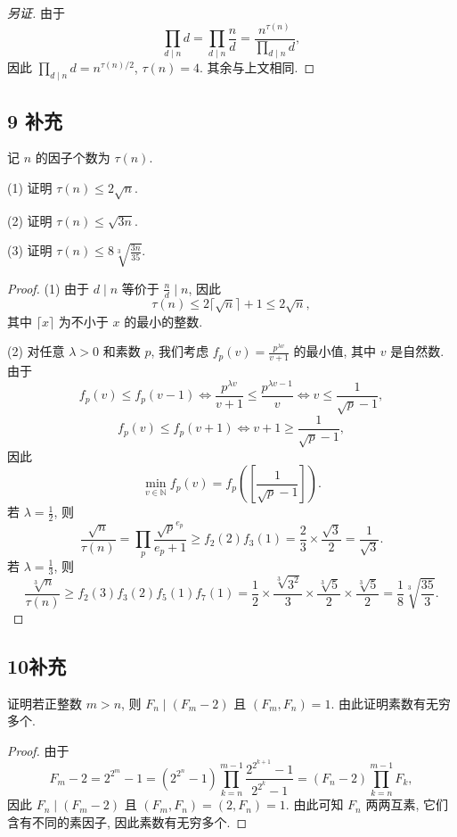\documentclass[12pt,a4paper,reqno]{amsart}
\theoremstyle{remark}
\renewcommand{\le}{\leqslant}
\renewcommand{\ge}{\geqslant}
\begin{document}
\begin{proof}[另证]
由于
  \[
     \prod_{d\mid n}d=\prod_{d\mid n}\frac{n}{d}
    =\frac{n^{\tau(n)}}{\prod_{d\mid n}d},\]
因此 $\prod\limits_{d\mid n} d=n^{\tau(n)/2}$, $\tau(n)=4$. 其余与上文相同.
\end{proof}

\subsection*{9 补充}
记 $n$ 的因子个数为 $\tau(n)$.

(1) 证明 $\tau(n)\le 2\sqrt{n}$.

(2) 证明 $\tau(n)\le \sqrt{3n}$.

(3) 证明 $\tau(n)\le 8\sqrt[3]{\frac{3n}{35}}$.

\begin{proof}
(1) 由于 $d\mid n$ 等价于 $\frac{n}{d}\mid n$, 因此
  \[\tau(n)\le 2\lceil\sqrt{n}\rceil+1\le 2\sqrt{n},\]
其中 $\lceil x\rceil$ 为不小于 $x$ 的最小的整数.

(2) 对任意 $\lambda>0$ 和素数 $p$, 我们考虑 $f_p(v)=\frac{p^{\lambda v}}{v+1}$ 的最小值, 其中 $v$ 是自然数. 由于
  \[f_p(v)\le f_p(v-1)\iff
  \frac{p^{\lambda v}}{v+1}\le \frac{p^{\lambda {v-1}}}{v}
  \iff  v\le\frac{1}{\sqrt{p}-1},\]
  \[f_p(v)\le f_p(v+1)\iff v+1\geqslant \frac{1}{\sqrt{p}-1},\]
因此
  \[\min_{v\in\mathbb{N}} f_p(v)=f_p([\frac{1}{\sqrt{p}-1}]).\]
若 $\lambda=\frac{1}{2}$, 则
  \[
    \frac{\sqrt{n}}{\tau(n)}=\prod_p \frac{\sqrt{p}^{e_p}}{e_p+1}
    \ge f_2(2)f_3(1)=\frac{2}{3}\times \frac{\sqrt{3}}{2}=\frac{1}{\sqrt{3}}.
  \]
若 $\lambda=\frac{1}{3}$, 则
  \[
    \frac{\sqrt[3]{n}}{\tau(n)}
    \ge f_2(3)f_3(2)f_5(1)f_7(1)
    =\frac{1}{2}\times\frac{\sqrt[3]{3^2}}{3}
     \times\frac{\sqrt[3]{5}}{2}\times\frac{\sqrt[3]{5}}{2}
    =\frac{1}{8}\sqrt[3]{\frac{35}{3}}.
  \]
\end{proof}

\subsection*{10补充}
证明若正整数 $m>n$, 则 $F_n\mid (F_m-2)$ 且 $(F_m,F_n)=1$. 由此证明素数有无穷多个.
\begin{proof}
由于
  \[
    F_m-2
   =2^{2^m}-1
   =(2^{2^n}-1)\prod_{k=n}^{m-1}\frac{2^{2^{k+1}}-1}{2^{2^k}-1}
   =(F_n-2)\prod_{k=n}^{m-1}F_k,\]
因此 $F_n\mid (F_m-2)$ 且 $(F_m,F_n)=(2,F_n)=  1$. 由此可知 $F_n$ 两两互素, 它们含有不同的素因子, 因此素数有无穷多个.
\end{proof}
\end{document}
